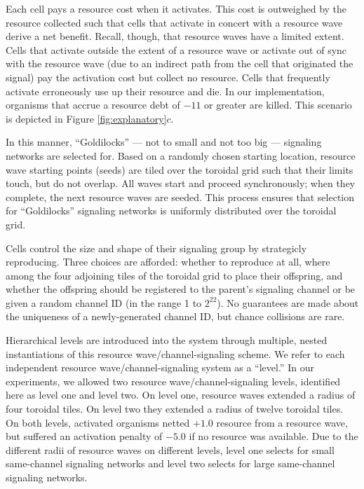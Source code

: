 Each cell pays a resource cost when it activates. %
This cost is outweighed by the resource collected such that cells that activate in concert with a resource wave derive a net benefit.
Recall, though, that resource waves have a limited extent.
Cells that activate outside the extent of a resource wave or activate out of sync with the resource wave (due to an indirect path from the cell that originated the signal) pay the activation cost but collect no resource.
Cells that frequently activate erroneously use up their resource and die.
In our implementation, organisms that accrue a resource debt of $-11$ or greater are killed.
This scenario is depicted in Figure \ref{fig:explanatory}$c$.

In this manner, ``Goldilocks'' --- not to small and not too big --- %
signaling networks are selected for.
Based on a randomly chosen starting location, resource wave starting points (seeds) are tiled over the toroidal grid such that their limits touch, but do not overlap.
All waves start and proceed synchronously;
when they complete, the next resource waves are seeded.
This process ensures that selection for ``Goldilocks'' %
signaling networks is uniformly distributed over the toroidal grid.

Cells control the size and shape of their %
signaling group by strategicly reproducing. %
Three choices are afforded: whether to reproduce at all, where among the four adjoining tiles of the toroidal grid to place their offspring, and whether the offspring should be registered to the parent's signaling channel or %
be given
a random channel ID (in the range 1 to $2^{22}$).
No guarantees are made about the uniqueness of a newly-generated channel ID, but chance collisions are rare.

Hierarchical levels are introduced into the system through multiple, 
nested instantiations of this resource wave/channel-signaling scheme.
We refer to each independent resource wave/channel-signaling system as a ``level.''
In our experiments, we allowed two resource wave/channel-signaling levels, identified here as level one and level two.
On level one, resource waves extended a radius of four toroidal tiles.
On level two they extended a radius of twelve toroidal tiles.
On both levels, activated organisms netted $+1.0$ resource from a resource wave, but suffered an activation penalty of $-5.0$ if no resource was available.
Due to the different radii of resource waves on different levels, level one selects for small same-channel signaling networks and level two selects for large same-channel signaling networks.

